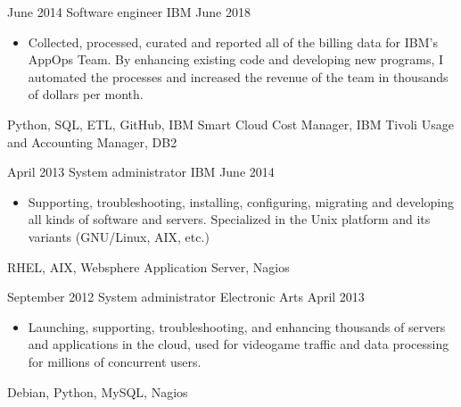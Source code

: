 \begin{experiences}
    \emptySeparator

    \experience
        {June 2014}
        {Software engineer}
        {IBM}
        {June 2018}
        {
            \begin{itemize}
                \item Collected, processed, curated and reported all of the 
                    billing data for IBM's AppOps Team. By enhancing existing 
                    code and developing new programs, I automated the processes 
                    and increased the revenue of the team in thousands of 
                    dollars per month.
            \end{itemize}
        }
        {
            Python,
            SQL,
            ETL,
            GitHub,
            IBM Smart Cloud Cost Manager,
            IBM Tivoli Usage and Accounting Manager,
            DB2
        }

    \emptySeparator

    \experience
        {April 2013}
        {System administrator}
        {IBM}
        {June 2014}
        {
            \begin{itemize}
                \item Supporting, troubleshooting, installing, configuring, 
                    migrating and developing all kinds of software and servers. 
                    Specialized in the Unix platform and its variants 
                    (GNU/Linux, AIX, etc.)
            \end{itemize}
        }
        {
            RHEL,
            AIX,
            Websphere Application Server,
            Nagios
        }

    \emptySeparator

    \experience
        {September 2012}
        {System administrator}
        {Electronic Arts}
        {April 2013}
        {
            \begin{itemize}
                \item Launching, supporting, troubleshooting, and enhancing
                    thousands of servers and applications in the cloud, used 
                    for videogame traffic and data processing for millions of 
                    concurrent users.
            \end{itemize}
        }
        {
            Debian,
            Python,
            MySQL,
            Nagios
        }

    \emptySeparator


\end{experiences}
